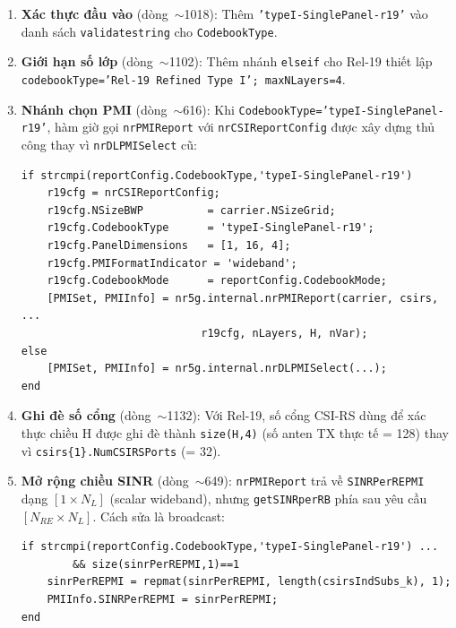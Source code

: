 \documentclass[11pt,a4paper]{article}
\begin{document}
\begin{enumerate}
    \item \textbf{Xác thực đầu vào} (dòng~$\sim$1018): Thêm
          \texttt{'typeI-SinglePanel-r19'} vào danh sách \texttt{validatestring}
          cho \texttt{CodebookType}.

    \item \textbf{Giới hạn số lớp} (dòng~$\sim$1102): Thêm nhánh \texttt{elseif}
          cho Rel-19 thiết lập \texttt{codebookType='Rel-19 Refined Type I'; maxNLayers=4}.

    \item \textbf{Nhánh chọn PMI} (dòng~$\sim$616): Khi
          \texttt{CodebookType='typeI-SinglePanel-r19'}, hàm giờ gọi
          \texttt{nrPMIReport} với \texttt{nrCSIReportConfig} được xây dựng thủ công
          thay vì \texttt{nrDLPMISelect} cũ:

\begin{lstlisting}[style=matlab, caption={Nhánh PMI thêm vào nrCQISelect cho Rel-19}]
if strcmpi(reportConfig.CodebookType,'typeI-SinglePanel-r19')
    r19cfg = nrCSIReportConfig;
    r19cfg.NSizeBWP          = carrier.NSizeGrid;
    r19cfg.CodebookType      = 'typeI-SinglePanel-r19';
    r19cfg.PanelDimensions   = [1, 16, 4];
    r19cfg.PMIFormatIndicator = 'wideband';
    r19cfg.CodebookMode      = reportConfig.CodebookMode;
    [PMISet, PMIInfo] = nr5g.internal.nrPMIReport(carrier, csirs, ...
                            r19cfg, nLayers, H, nVar);
else
    [PMISet, PMIInfo] = nr5g.internal.nrDLPMISelect(...);
end
\end{lstlisting}

    \item \textbf{Ghi đè số cổng} (dòng~$\sim$1132): Với Rel-19, số cổng CSI-RS
          dùng để xác thực chiều H được ghi đè thành \texttt{size(H,4)}
          (số anten TX thực tế = 128) thay vì \texttt{csirs\{1\}.NumCSIRSPorts} (= 32).

    \item \textbf{Mở rộng chiều SINR} (dòng~$\sim$649): \texttt{nrPMIReport} trả về
          \texttt{SINRPerREPMI} dạng $[1 \times N_L]$ (scalar wideband), nhưng
          \texttt{getSINRperRB} phía sau yêu cầu $[N_{RE} \times N_L]$. Cách sửa
          là broadcast:
\begin{lstlisting}[style=matlab]
if strcmpi(reportConfig.CodebookType,'typeI-SinglePanel-r19') ...
        && size(sinrPerREPMI,1)==1
    sinrPerREPMI = repmat(sinrPerREPMI, length(csirsIndSubs_k), 1);
    PMIInfo.SINRPerREPMI = sinrPerREPMI;
end
\end{lstlisting}
\end{enumerate}
\end{document}
